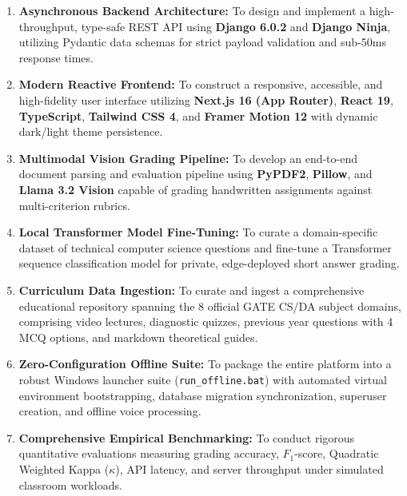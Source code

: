 \begin{enumerate}[leftmargin=*]
    \item \textbf{Asynchronous Backend Architecture:} To design and implement a high-throughput, type-safe REST API using \textbf{Django 6.0.2} and \textbf{Django Ninja}, utilizing Pydantic data schemas for strict payload validation and sub-50ms response times.
    \item \textbf{Modern Reactive Frontend:} To construct a responsive, accessible, and high-fidelity user interface utilizing \textbf{Next.js 16 (App Router)}, \textbf{React 19}, \textbf{TypeScript}, \textbf{Tailwind CSS 4}, and \textbf{Framer Motion 12} with dynamic dark/light theme persistence.
    \item \textbf{Multimodal Vision Grading Pipeline:} To develop an end-to-end document parsing and evaluation pipeline using \textbf{PyPDF2}, \textbf{Pillow}, and \textbf{Llama 3.2 Vision} capable of grading handwritten assignments against multi-criterion rubrics.
    \item \textbf{Local Transformer Model Fine-Tuning:} To curate a domain-specific dataset of technical computer science questions and fine-tune a Transformer sequence classification model for private, edge-deployed short answer grading.
    \item \textbf{Curriculum Data Ingestion:} To curate and ingest a comprehensive educational repository spanning the 8 official GATE CS/DA subject domains, comprising video lectures, diagnostic quizzes, previous year questions with 4 MCQ options, and markdown theoretical guides.
    \item \textbf{Zero-Configuration Offline Suite:} To package the entire platform into a robust Windows launcher suite (\texttt{run\_offline.bat}) with automated virtual environment bootstrapping, database migration synchronization, superuser creation, and offline voice processing.
    \item \textbf{Comprehensive Empirical Benchmarking:} To conduct rigorous quantitative evaluations measuring grading accuracy, $F_1$-score, Quadratic Weighted Kappa ($\kappa$), API latency, and server throughput under simulated classroom workloads.
\end{enumerate}


